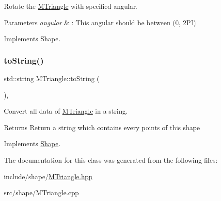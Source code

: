 Rotate the \hyperlink{classMTriangle}{M\+Triangle} with specified angular. 


\begin{DoxyParams}{Parameters}
{\em angular} & \+: This angular should be between (0, 2\+PI) \\
\hline
\end{DoxyParams}


Implements \hyperlink{classShape_a2dea8616fd40f2d69fd208715921982a}{Shape}.

\mbox{\label{classMTriangle_a7d1fd825592dffa6ac05b3398a8c105a}} 
\subsubsection{\texorpdfstring{to\+String()}{toString()}}
{\footnotesize\ttfamily std\+::string M\+Triangle\+::to\+String (\begin{DoxyParamCaption}{ }\end{DoxyParamCaption})\hspace{0.3cm}{\ttfamily [override]}, {\ttfamily [virtual]}}



Convert all data of \hyperlink{classMTriangle}{M\+Triangle} in a string. 

\begin{DoxyReturn}{Returns}
Return a string which contains every points of this shape 
\end{DoxyReturn}


Implements \hyperlink{classShape_a98fa87c6dc4c7045fd6897a8f3bc186c}{Shape}.



The documentation for this class was generated from the following files\+:\begin{DoxyCompactItemize}
\item 
include/shape/\hyperlink{MTriangle_8hpp}{M\+Triangle.\+hpp}\item 
src/shape/M\+Triangle.\+cpp\end{DoxyCompactItemize}

